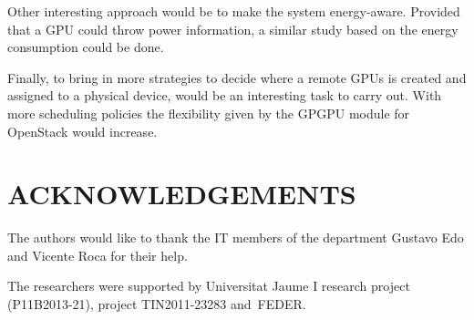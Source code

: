 \documentclass[a4paper,twoside]{article}
\begin{document}
Other interesting approach would be to make the system energy-aware. 
Provided that a GPU could throw power information, a similar study based on the energy consumption could be done.

Finally, to bring in more strategies to decide where a remote GPUs is created and assigned to a physical device, would be an interesting task to carry out. 
With more scheduling policies the flexibility given by the GPGPU module for OpenStack would increase.

\section*{\uppercase{Acknowledgements}}
The authors would like to thank the IT members of the department Gustavo Edo and Vicente Roca for their help.

The researchers were supported by Universitat Jaume I research project (P11B2013-21), project
TIN2011-23283 and~FEDER.


{\small
}
\end{document}
